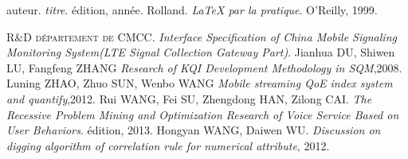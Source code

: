 \begin{thebibliography}{ABC}	
     auteur. \emph{titre}. édition, année.
     Rolland. \emph{LaTeX par la pratique}. O'Reilly, 1999.
    
    R\&D \textsc{département de }CMCC.   \emph{Interface Specification of China Mobile Signaling Monitoring System(LTE Signal Collection Gateway Part)}.
    Jianhua DU, Shiwen LU, Fangfeng ZHANG  \emph{Research of KQI Development Methodology in SQM},2008.
    Luning ZHAO, Zhuo SUN, Wenbo WANG  \emph{Mobile streaming QoE index system and quantify},2012.
     Rui WANG, Fei SU, Zhengdong HAN, Zilong CAI. \emph{The Recessive Problem Mining and Optimization Research of Voice Service Based on User Behaviors}. édition, 2013.
      Hongyan WANG, Daiwen WU. \emph{Discussion on digging algorithm of correlation rule for numerical attribute}, 2012.
\end{thebibliography}

%